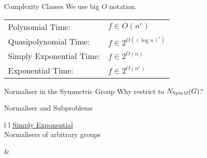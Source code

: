 \begin{frame}{Complexity Classes}
    We use big $O$ notation.
    \pause
    \\[2em]
    \hspace{2em}
    \begin{tabular}{l l}
    Polynomial Time:
    &
    $f \in O(n ^ c)$
    \\
    \pause
    Quasipolynomial Time:
    &
    $f \in 2 ^ {O((\log n) ^ c)}$
    \\
    \pause
    Simply Exponential Time:
    &
    $f \in 2 ^ {O(n)}$
    \\
    \pause
    Exponential Time:
    &
    $f \in 2 ^ {O(n ^ c)}$
    \end{tabular}
\end{frame}


\begin{frame}{Normaliser in the Symmetric Group}
    \centering
    \Large
    Why restrict to $N_{\operatorname{Sym} \Omega}(G)$?
\end{frame}

\begin{frame}{Normaliser and Subproblems}
    \begin{tabular}{l l}
        {\underline{Simply Exponential} \hspace{4em} $~$}
        \\[0.5em]
        {Normalisers of arbitrary groups}
        \\[2.5em]
        \pause

        \pause
        &
    \end{tabular}
    \vfill
\end{frame}
